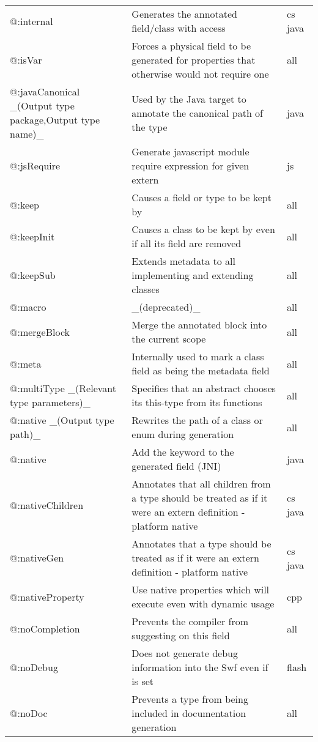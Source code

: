 \begin{center}
\begin{tabular}{| l | l | l |}
	@:internal  &  Generates the annotated field/class with \expr{internal} access  &  cs  java \\
	@:isVar  &  Forces a physical field to be generated for properties that otherwise would not require one  &  all \\
	@:javaCanonical \_(Output type package,Output type name)\_ &  Used by the Java target to annotate the canonical path of the type  &  java \\
	@:jsRequire  &  Generate javascript module require expression for given extern  &  js \\
	@:keep   &  Causes a field or type to be kept by \tref{DCE}{cr-dce}  &  all \\
	@:keepInit  &  Causes a class to be kept by \tref{DCE}{cr-dce} even if all its field are removed  &  all \\
	@:keepSub &  Extends \expr{@:keep} metadata to all implementing and extending classes  &  all \\
	@:macro  &  \_(deprecated)\_  &  all \\
	@:mergeBlock  &  Merge the annotated block into the current scope  &  all \\
	@:meta   &  Internally used to mark a class field as being the metadata field  &  all \\
	@:multiType \_(Relevant type parameters)\_  &  Specifies that an abstract chooses its this-type from its \expr{@:to} functions  &  all \\
	@:native \_(Output type path)\_  &  Rewrites the path of a class or enum during generation  &  all \\
	@:native  &  Add the \expr{native} keyword to the generated field (JNI)  &  java \\
	@:nativeChildren  &  Annotates that all children from a type should be treated as if it were an extern definition - platform native  &  cs java \\
	@:nativeGen  &  Annotates that a type should be treated as if it were an extern definition - platform native  &  cs  java \\
	@:nativeProperty  &  Use native properties which will execute even with dynamic usage  &  cpp \\
	@:noCompletion  &  Prevents the compiler from suggesting \tref{completion}{cr-completion} on this field  &  all \\
	@:noDebug &  Does not generate debug information into the Swf even if \expr{-debug} is set   &  flash \\
	@:noDoc  &  Prevents a type from being included in documentation generation  &  all \\

\end{tabular}
\end{center}

